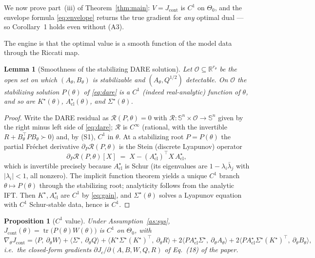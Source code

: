 \documentclass[11pt]{article}
\newtheorem{lemma}{Lemma}
\newtheorem{proposition}{Proposition}
\theoremstyle{definition}
\DeclareMathOperator{\tr}{tr}
\newcommand{\R}{\mathbb{R}}
\newcommand{\Sym}{\mathbb{S}}
\newcommand{\Acl}{A_{\mathrm{cl}}}
\newcommand{\Th}{\theta}
\newcommand{\Nbhd}{\Theta_{0}}
\newcommand{\half}{{1/2}}
\newcommand{\Sig}{\Sigma}
\begin{document}
We now prove part~(iii) of Theorem~\ref{thm:main}: $V=J_{\mathrm{cont}}$ is $C^1$
on $\Nbhd$, and the envelope formula \eqref{eq:envelope} returns the true
gradient for \emph{any} optimal dual --- so Corollary~1 holds even without (A3).

The engine is that the optimal value is a smooth function of the model data
through the Riccati map.

\begin{lemma}[Smoothness of the stabilizing DARE solution]\label{lem:daresmooth}
Let $\mathcal O\subseteq\R^{r_\theta}$ be the open set on which
$(A_\Th,B_\Th)$ is stabilizable and $(A_\Th,Q^{\half})$ detectable. On $\mathcal
O$ the stabilizing solution $P(\Th)$ of \eqref{eq:dare} is a $C^1$
\textup{(}indeed real-analytic\textup{)} function of $\Th$, and so are
$K^\star(\Th)$, $\Acl^\star(\Th)$, and $\Sig^\star(\Th)$.
\end{lemma}

\begin{proof}
Write the DARE residual as $\mathcal R(P,\Th)=0$ with $\mathcal
R:\Sym^n\times\mathcal O\to\Sym^n$ given by the right minus left side of
\eqref{eq:dare}; $\mathcal R$ is $C^\infty$ (rational, with the invertible
$R+B_\Th^\top PB_\Th\succ0$) and, by (S1), $C^1$ in $\Th$. At a stabilizing root
$P=P(\Th)$ the partial Fréchet derivative $\partial_P\mathcal R(P,\Th)$ is the
Stein (discrete Lyapunov) operator
\[
\partial_P\mathcal R(P,\Th)[X]\;=\;X-(\Acl^\star)^\top X\,\Acl^\star ,
\]
which is invertible precisely because $\Acl^\star$ is Schur (its eigenvalues are
$1-\lambda_i\bar\lambda_j$ with $|\lambda_i|<1$, all nonzero). The implicit
function theorem yields a unique $C^1$ branch $\Th\mapsto P(\Th)$ through the
stabilizing root; analyticity follows from the analytic IFT. Then
$K^\star,\Acl^\star$ are $C^1$ by \eqref{eq:gain}, and $\Sig^\star(\Th)$ solves a
Lyapunov equation with $C^1$ Schur-stable data, hence is $C^1$.
\end{proof}

\begin{proposition}[$C^1$ value]\label{prop:c1value}
Under Assumption~\ref{as:sys}, $J_{\mathrm{cont}}(\Th)=\tr\!\big(P(\Th)W(\Th)\big)$
is $C^1$ on $\Nbhd$, with
\begin{equation}\label{eq:gradV}
\nabla_\Th J_{\mathrm{cont}}=\big\langle P,\ \partial_\Th W\big\rangle
+\big\langle \Sig^\star,\ \partial_\Th Q\big\rangle
+\big\langle K^\star\Sig^\star(K^\star)^\top,\ \partial_\Th R\big\rangle
+2\big\langle P\Acl^\star\Sig^\star,\ \partial_\Th A_\Th\big\rangle
+2\big\langle P\Acl^\star\Sig^\star(K^\star)^\top,\ \partial_\Th B_\Th\big\rangle,
\end{equation}
i.e.\ the closed-form gradients $\partial J_c/\partial(A,B,W,Q,R)$ of Eq.~(18) of
the paper.
\end{proposition}
\end{document}
